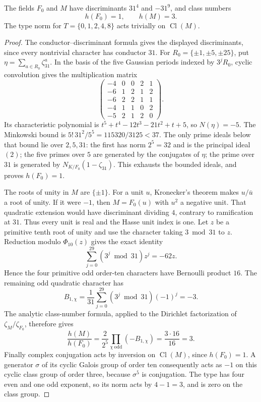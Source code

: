 \begin{proposition}
\label{prop:thirtyone-cm-class-numbers}
The fields $F_0$ and $M$ have discriminants $31^4$ and $-31^9$,
and class numbers
\[
 h(F_0)=1,\qquad h(M)=3.
\]
The type norm for $T=\{0,1,2,4,8\}$ acts trivially on
$\operatorname{Cl}(M)$.
\end{proposition}
\begin{proof}
The conductor--discriminant formula gives the displayed
discriminants, since every nontrivial character has conductor $31$.
For $R_0=\{\pm1,\pm5,\pm25\}$, put
$\eta=\sum_{a\in R_0}\zeta_{31}^a$.
In the basis of the five Gaussian periods indexed by
$3^jR_0$, cyclic convolution gives the multiplication matrix
\[
 \begin{pmatrix}
 -4&0&0&2&1\\ -6&1&2&1&2\\ -6&2&2&1&1\\
 -4&1&1&0&2\\ -5&2&1&2&0
 \end{pmatrix}.
\]
Its characteristic polynomial is
$t^5+t^4-12t^3-21t^2+t+5$, so $N(\eta)=-5$.
The Minkowski bound is
$5!\,31^2/5^5=115320/3125<37$.
The only prime ideals below that bound lie over $2,5,31$:
the first has norm $2^5=32$ and is the principal ideal $(2)$;
the five primes over $5$ are generated by the conjugates of
$\eta$; the prime over $31$ is generated by
$N_{K/F_0}(1-\zeta_{31})$. This exhausts the bounded ideals,
and proves $h(F_0)=1$.

The roots of unity in $M$ are $\{\pm1\}$. For a unit $u$,
Kronecker's theorem makes $u/\bar u$ a root of unity.
If it were $-1$, then $M=F_0(u)$ with $u^2$ a negative unit.
That quadratic extension would have discriminant dividing $4$,
contrary to ramification at $31$. Thus every unit is real and
the Hasse unit index is one. Let $z$ be a primitive tenth root
of unity and use the character taking $3\bmod31$ to $z$.
Reduction modulo $\Phi_{10}(z)$ gives the exact identity
\[
 \sum_{j=0}^{29}(3^j\bmod31)z^j=-62z.
\]
Hence the four primitive odd order-ten characters have
Bernoulli product $16$. The remaining odd quadratic character has
\[
 B_{1,\chi}=\frac1{31}\sum_{j=0}^{29}(3^j\bmod31)(-1)^j=-3.
\]
The analytic class-number formula, applied to the Dirichlet
factorization of $\zeta_M/\zeta_{F_0}$, therefore gives
\[
 \frac{h(M)}{h(F_0)}=\frac{2}{2^5}
       \prod_{\chi\ \mathrm{odd}}(-B_{1,\chi})
       =\frac{3\cdot16}{16}=3.
\]
Finally complex conjugation acts by inversion on $\operatorname{Cl}(M)$,
since $h(F_0)=1$. A generator $\sigma$ of its cyclic Galois
group of order ten consequently acts as $-1$ on this cyclic
class group of order three, because $\sigma^5$ is conjugation.
The type has four even and one odd exponent, so its norm acts
by $4-1=3$, and is zero on the class group.
\end{proof}

